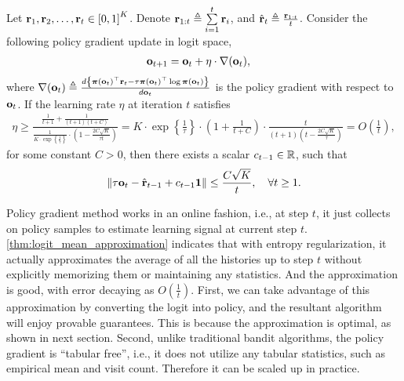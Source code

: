 \begin{thm}
\label{thm:logit_mean_approximation}
Let ${\mathbf{r}}_1, {\mathbf{r}}_2, \dots, {\mathbf{r}}_t \in \left[ 0, 1  \right]^K$. Denote ${\mathbf{r}}_{1:t} \triangleq \sum\limits_{i=1}^{t}{{\mathbf{r}}_i}$, and $\hat{{\mathbf{r}}}_t \triangleq \frac{{\mathbf{r}}_{1:t}}{t}$. Consider the following policy gradient update in logit space,
\begin{equation*}
\begin{split}
    {\mathbf{o}}_{t+1} &= {\mathbf{o}}_t + \eta \cdot \nabla({\mathbf{o}}_t),
\end{split}
\end{equation*}
where $\nabla({\mathbf{o}}_t) \triangleq \frac{d \left\{ {\boldsymbol{\pi}}({\mathbf{o}}_t)^\top {\mathbf{r}}_t - \tau {\boldsymbol{\pi}}({\mathbf{o}}_t)^\top \log{{\boldsymbol{\pi}}({\mathbf{o}}_t)} \right\} }{d {\mathbf{o}}_t} $ is the policy gradient with respect to ${\mathbf{o}}_t$. If the learning rate $\eta$ at iteration $t$ satisfies
\begin{equation*}
\begin{split}
    \eta \ge \frac{ \frac{1}{t+1} + \frac{1}{(t+1)(t+C)} }{ \frac{1}{K \cdot \exp\left\{ \frac{1}{\tau} \right\} } \cdot \left( 1 - \frac{2 C \sqrt{K}}{\tau t} \right)  } = K \cdot \exp\left\{ \frac{1}{\tau} \right\} \cdot \left( 1 + \frac{1}{t+C} \right) \cdot \frac{t}{\left( t+1\right) \left( t - \frac{2C\sqrt{K}}{\tau} \right)} = O\left( \frac{1}{t} \right),
\end{split}
\end{equation*}
for some constant $C > 0$, then there exists a scalar $c_{t-1} \in {\mathbb{R}}$, such that
\begin{equation*}
    \left\| \tau {\mathbf{o}}_{t} - \hat{{\mathbf{r}}}_{t-1} + c_{t-1} {\mathbf{1}} \right\| \le \frac{C \sqrt{K}}{t}, \quad \forall t \ge 1.
\end{equation*}
\end{thm}

Policy gradient method works in an online fashion, i.e., at step $t$, it just collects on policy samples to estimate learning signal at current step $t$.  \cref{thm:logit_mean_approximation} indicates that with entropy regularization, it actually approximates the average of all the histories up to step $t$ without explicitly memorizing them or maintaining any statistics. And the approximation is good, with error decaying as $O\left( \frac{1}{t} \right)$. First, we can take advantage of this approximation by converting the logit into policy, and the resultant algorithm will enjoy provable guarantees. This is because the approximation is optimal, as shown in next section. Second, unlike traditional bandit algorithms, the policy gradient is ``tabular free'', i.e., it does not utilize any tabular statistics, such as empirical mean and visit count. Therefore it can be scaled up in practice.
